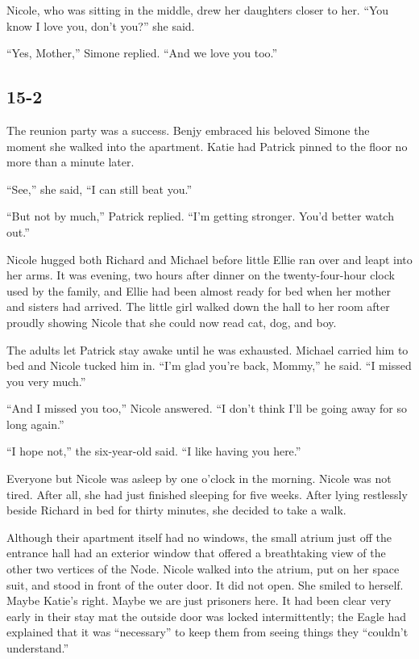 \documentclass[]{article}
\begin{document}
{Nicole, who was sitting in the middle, drew her daughters closer to her.  “You know I love you, don’t you?” she said.

“Yes, Mother,” Simone replied.  “And we love you too.”

\subsection*{15-2}

The reunion party was a success.  Benjy embraced his beloved Simone the moment she walked into the apartment.  Katie had Patrick pinned to the floor no more than a minute later.

“See,” she said, “I can still beat you.”

“But not by much,” Patrick replied.  “I’m getting stronger.  You’d better watch out.”

Nicole hugged both Richard and Michael before little Ellie ran over and leapt into her arms.  It was evening, two hours after dinner on the twenty-four-hour clock used by the family, and Ellie had been almost ready for bed when her mother and sisters had arrived.  The little girl walked down the hall to her room after proudly showing Nicole that she could now read cat, dog, and boy.

The adults let Patrick stay awake until he was exhausted.  Michael carried him to bed and Nicole tucked him in.  “I’m glad you’re back, Mommy,” he said.  “I missed you very much.”

“And I missed you too,” Nicole answered.  “I don’t think I’ll be going away for so long again.”

“I hope not,” the six-year-old said.  “I like having you here.”

Everyone but Nicole was asleep by one o’clock in the morning.  Nicole was not tired.  After all, she had just finished sleeping for five weeks.  After lying restlessly beside Richard in bed for thirty minutes, she decided to take a walk.

Although their apartment itself had no windows, the small atrium just off the entrance hall had an exterior window that offered a breathtaking view of the other two vertices of the Node.  Nicole walked into the atrium, put on her space suit, and stood in front of the outer door.  It did not open.  She smiled to herself.  Maybe Katie’s right.  Maybe we are just prisoners here.  It had been clear very early in their stay mat the outside door was locked intermittently; the Eagle had explained that it was “necessary” to keep them from seeing things they “couldn’t understand.”

}
\end{document}
